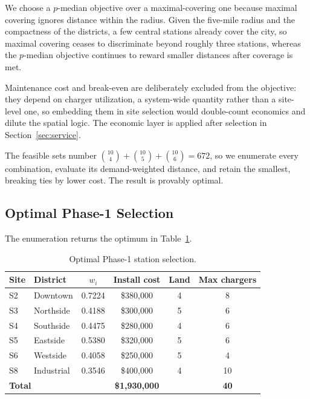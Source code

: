 \documentclass[11pt]{article}
\begin{document}
We choose a $p$-median objective over a maximal-covering one because maximal covering ignores distance within the radius. Given the five-mile radius and the compactness of the districts, a few central stations already cover the city, so maximal covering ceases to discriminate beyond roughly three stations, whereas the $p$-median objective continues to reward smaller distances after coverage is met.

Maintenance cost and break-even are deliberately excluded from the objective: they depend on charger utilization, a system-wide quantity rather than a site-level one, so embedding them in site selection would double-count economics and dilute the spatial logic. The economic layer is applied after selection in Section~\ref{sec:service}.

The feasible sets number $\binom{10}{4} + \binom{10}{5} + \binom{10}{6} = 672$, so we enumerate every combination, evaluate its demand-weighted distance, and retain the smallest, breaking ties by lower cost. The result is provably optimal.

\subsection{Optimal Phase-1 Selection}

The enumeration returns the optimum in Table~\ref{tab:phase1}.

\begin{table}[H]
\centering
\caption{Optimal Phase-1 station selection.}
\label{tab:phase1}
\begin{tabular}{llcccc}
\toprule
Site & District & $w_i$ & Install cost & Land & Max chargers \\
\midrule
S2 & Downtown   & 0.7224 & \$380{,}000 & 4 &  8 \\
S3 & Northside  & 0.4188 & \$300{,}000 & 5 &  6 \\
S4 & Southside  & 0.4475 & \$280{,}000 & 4 &  6 \\
S5 & Eastside   & 0.5380 & \$320{,}000 & 5 &  6 \\
S6 & Westside   & 0.4058 & \$250{,}000 & 5 &  4 \\
S8 & Industrial & 0.3546 & \$400{,}000 & 4 & 10 \\
\midrule
\multicolumn{2}{l}{\textbf{Total}} & & \textbf{\$1{,}930{,}000} & & \textbf{40} \\
\bottomrule
\end{tabular}
\end{table}
\end{document}
